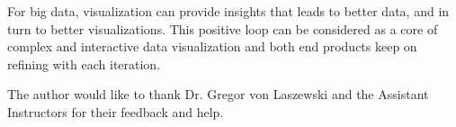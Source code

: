For big data, visualization can provide insights that leads to better data, and in turn to better visualizations. This positive loop can be considered as a core of complex and interactive data visualization and both end products keep on refining with each iteration. 


\begin{acks}

  The author would like to thank Dr. Gregor von Laszewski and the Assistant Instructors for their feedback and help.
\end{acks}


 




